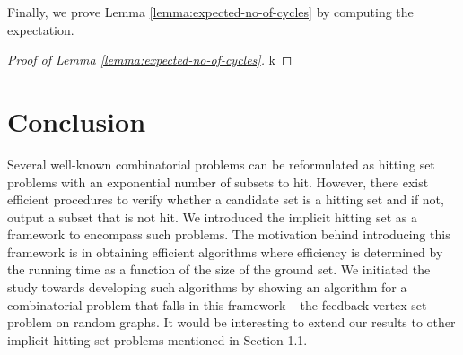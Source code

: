 \documentclass[11pt]{article}
\begin{document}
Finally, we prove Lemma \ref{lemma:expected-no-of-cycles} by computing the expectation.
\begin{proof}[Proof of Lemma \ref{lemma:expected-no-of-cycles}]
k


\end{proof}

\section{Conclusion}
Several well-known combinatorial problems can be reformulated as hitting set problems with an exponential number of subsets to hit. However, there exist efficient procedures to verify whether a candidate set is a hitting set and if not, output a subset that is not hit. We introduced the implicit hitting set as a framework to encompass such problems. The motivation behind introducing this framework is in obtaining efficient algorithms where efficiency is determined by the running time as a function of the size of the ground set. We initiated the study towards developing such algorithms by showing an algorithm for a combinatorial problem that falls in this framework -- the feedback vertex set problem on random graphs. It would be interesting to extend our results to other implicit hitting set problems mentioned in Section 1.1.




\end{document}
